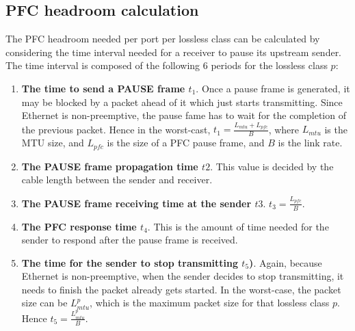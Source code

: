 \begin{appendices}
\section{PFC headroom calculation}\label{APPHEADROOM}

The PFC headroom needed per port per lossless class can be calculated by considering the time interval needed for a receiver to pause its upstream sender. The time interval is composed of the following 6 periods for the lossless class $p$:

\begin{enumerate}
	
\item\textbf{The time to send a PAUSE frame $t_1$}. 
Once a pause frame is generated, it may be blocked by a packet ahead of it which just starts transmitting. Since Ethernet is non-preemptive, the pause fame has to wait for the completion of the previous packet. Hence in the worst-cast, $t_1 = \frac{ L_{mtu} + L_{pfc}}{B}$, where $L_{mtu}$ is the MTU size, and $L_{pfc}$ is the size of a PFC pause frame, and $B$ is the link rate. 


\item\textbf{The PAUSE frame propagation time $t2$}. This value is decided by the cable length between the sender and receiver. 

\item\textbf{The PAUSE frame receiving time at the sender $t3$}. $t_3=\frac{L_{pfc}}{B}$.

\item\textbf{The PFC response time $t_4$}. This is the amount of time needed for the sender to respond after the pause frame is received. 

\item\textbf{The time for the sender to stop transmitting $t_5$)}. Again, because Ethernet is non-preemptive, when the sender decides to stop transmitting, it needs to finish the packet already gets started. In the worst-case, the packet size can be $L^{p}_{mtu}$, which is the maximum packet size for that lossless class $p$. Hence $t_5 = \frac{L^{p}_{mtu}}{B}$. 


\end{enumerate}
\end{appendices}
